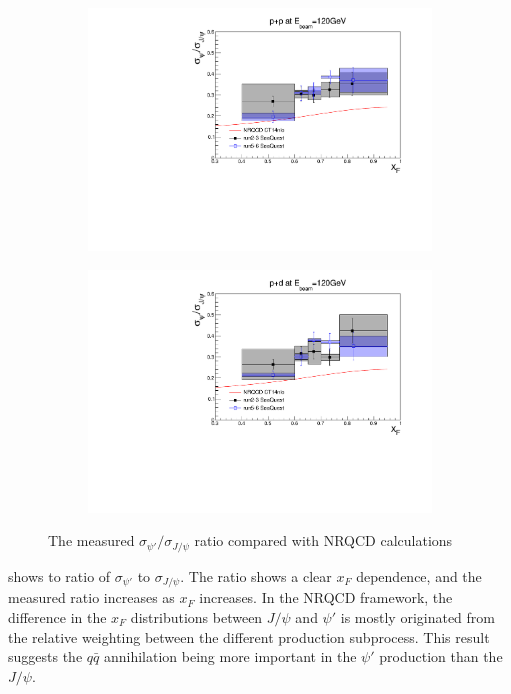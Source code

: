 \documentclass[reprint,aps,unsortedaddress,superscriptaddress,prd,floatfix,showpacs,linenumbers]{revtex4-2}
\begin{document}
\begin{figure}[h]
	\begin{subfigure}{0.45\linewidth}
		\includegraphics[width=\linewidth]{figures/crossSections/xF/ratio_xF_LH2_5-6_5770}
	\end{subfigure}
	\begin{subfigure}{0.45\linewidth}
		\includegraphics[width=\linewidth]{figures/crossSections/xF/ratio_xF_LD2_5-6_5770}
	\end{subfigure}
	\caption{The measured $\sigma_{\psi'}/\sigma_{J/\psi}$ ratio compared with NRQCD calculations}
	\label{fig:psip_jpsi_ratio_xF}
\end{figure}
 shows to ratio of $\sigma_{\psi'}$ to $\sigma_{J/\psi}$.
The ratio shows a clear $x_F$ dependence, and the measured ratio increases as $x_F$ increases.
In the NRQCD framework, the difference in the $x_F$ distributions between $J/\psi$ and $\psi'$
is mostly originated from the relative weighting between the different production subprocess.
This result suggests the $q\bar{q}$ annihilation being more important in the $\psi'$ production
than the $J/\psi$.
\end{document}
